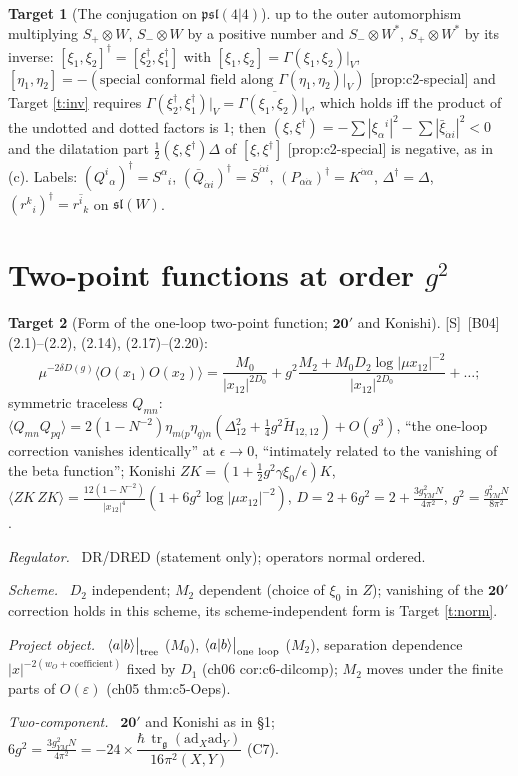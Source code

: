 \documentclass[11pt]{article}
\theoremstyle{definition}
\newtheorem{target}{Target}
\newcommand{\tr}{\operatorname{tr}}
\newcommand{\Sl}{\textup{[S]}}
\newcommand{\unit}{\dfrac{\hbar\,\tr_{\mathfrak g}(\mathrm{ad}_X\mathrm{ad}_Y)}{16\pi^2(X,Y)}}
\newcommand{\tree}{\big|_{\rm tree}}
\newcommand{\oneloop}{\big|_{\rm one\ loop}}
\newcommand{\fld}[1]{\par\textit{#1.}\ }
\begin{document}
\begin{target}[The conjugation on $\mathfrak{psl}(4|4)$]
up to the outer automorphism multiplying $S_+\otimes W$, $S_-\otimes W$ by a positive number and $S_-\otimes W^*$, $S_+\otimes W^*$ by its inverse: $[\xi_1,\xi_2]^\dagger=[\xi_2^\dagger,\xi_1^\dagger]$ with $[\xi_1,\xi_2]=\Gamma(\xi_1,\xi_2)|_V$, $[\eta_1,\eta_2]=-(\text{special conformal field along }\Gamma(\eta_1,\eta_2)|_V)$ [prop:c2-special] and Target \ref{t:inv} requires $\Gamma(\xi_2^\dagger,\xi_1^\dagger)|_V=\overline{\Gamma(\xi_1,\xi_2)|_V}$, which holds iff the product of the undotted and dotted factors is $1$; then $(\xi,\xi^\dagger)=-\sum|\xi_\alpha{}^i|^2-\sum|\bar\xi_{\dot\alpha i}|^2<0$ and the dilatation part $\tfrac12(\xi,\xi^\dagger)\Delta$ of $[\xi,\xi^\dagger]$ [prop:c2-special] is negative, as in (c). Labels: $(Q^i{}_\alpha)^\dagger=S^\alpha{}_i$, $(\bar Q_{\dot\alpha i})^\dagger=\bar S^{\dot\alpha i}$, $(P_{\alpha\dot\alpha})^\dagger=K^{\dot\alpha\alpha}$, $\Delta^\dagger=\Delta$, $(r^k{}_i)^\dagger=\overline{r^i{}_k}$ on $\mathfrak{sl}(W)$.
\end{target}

\section{Two-point functions at order $g^2$}

\begin{target}[Form of the one-loop two-point function; $\mathbf{20'}$ and Konishi]\label{t:b04-2pt}
\Sl\ [B04] (2.1)--(2.2), (2.14), (2.17)--(2.20):
\[
\mu^{-2\delta D(g)}\langle O(x_1)O(x_2)\rangle=\frac{M_0}{|x_{12}|^{2D_0}}+g^2\frac{M_2+M_0D_2\log|\mu x_{12}|^{-2}}{|x_{12}|^{2D_0}}+\dots ;
\]
symmetric traceless $Q_{mn}$: $\langle Q_{mn}Q_{pq}\rangle=2(1-N^{-2})\eta_{m(p}\eta_{q)n}(\Delta_{12}^2+\tfrac14g^2\tilde H_{12,12})+O(g^3)$, ``the one-loop correction vanishes identically'' at $\epsilon\to0$, ``intimately related to the vanishing of the beta function''; Konishi $ZK=(1+\tfrac12g^2\gamma\xi_0/\epsilon)K$, $\langle ZK\,ZK\rangle=\frac{12(1-N^{-2})}{|x_{12}|^4}(1+6g^2\log|\mu x_{12}|^{-2})$, $D=2+6g^2=2+\frac{3g_{YM}^2N}{4\pi^2}$, $g^2=\frac{g_{YM}^2N}{8\pi^2}$.
\fld{Regulator} DR/DRED (statement only); operators normal ordered.
\fld{Scheme} $D_2$ independent; $M_2$ dependent (choice of $\xi_0$ in $Z$); vanishing of the $\mathbf{20'}$ correction holds in this scheme, its scheme-independent form is Target \ref{t:norm}.
\fld{Project object} $\langle a|b\rangle\tree$ ($M_0$), $\langle a|b\rangle\oneloop$ ($M_2$), separation dependence $|x|^{-2(w_O+\text{coefficient})}$ fixed by $D_1$ (ch06 cor:c6-dilcomp); $M_2$ moves under the finite parts of $O(\varepsilon)$ (ch05 thm:c5-Oeps).
\fld{Two-component} $\mathbf{20'}$ and Konishi as in \S1; $6g^2=\frac{3g^2_{YM}N}{4\pi^2}=-24\times\unit$ (C7).
\end{target}
\end{document}
